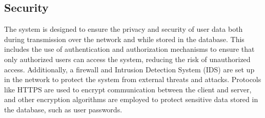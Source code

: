 \subsection{Security}\label{subsec:security}
The system is designed to ensure the privacy and security of user data both during transmission over the network and while stored in the database. This includes the 
use of authentication and authorization mechanisms to ensure that only authorized users can access the system, reducing the risk of unauthorized access. Additionally, 
a firewall and Intrusion Detection System (IDS) are set up in the network to protect the system from external threats and attacks. Protocols like HTTPS are used to 
encrypt communication between the client and server, and other encryption algorithms are employed to protect sensitive data stored in the database, such as user 
passwords.

